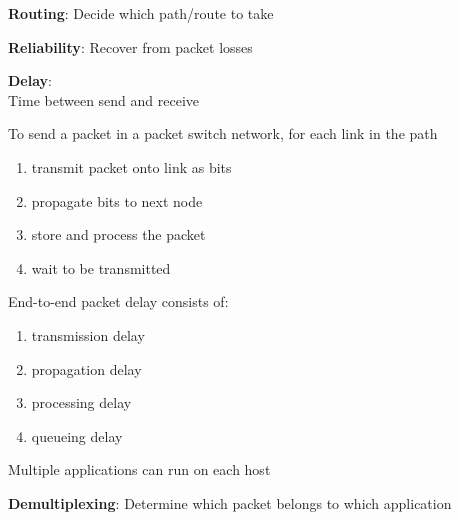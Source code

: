 \documentclass[20pt,handout,notes=show]{beamer}
\begin{document}
\begin{frame} \begin{center}\large
\textbf{Routing}: Decide which path/route to take
\end{center}\end{frame}

\begin{frame}\begin{center}\large
\textbf{Reliability}: Recover from packet losses
\end{center}\end{frame}

\begin{frame}\begin{center}\large
\textbf{Delay}:\\ Time between send and receive
\end{center}\end{frame}

\begin{frame}\normalsize
To send a packet in a packet switch network, for each link in the path
\begin{enumerate}
\item transmit packet onto link as bits
\item propagate bits to next node
\item store and process the packet
\item wait to be transmitted
\end{enumerate}
\end{frame}

\begin{frame}\normalsize
End-to-end packet delay consists of:
\begin{enumerate}
\item transmission delay
\item propagation delay
\item processing delay
\item queueing delay
\end{enumerate}
\end{frame}

\begin{frame}[t]
\end{frame}

\begin{frame}[t]\normalsize
	Multiple applications can run on each host
\end{frame}

\begin{frame}\begin{center}\large
\textbf{Demultiplexing}: Determine which packet belongs to which application
\end{center}\end{frame}
\end{document}
